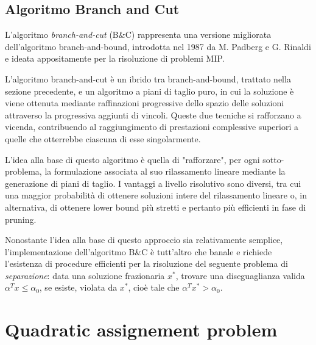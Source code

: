 \subsection{Algoritmo Branch and Cut}
L'algoritmo \textit{branch-and-cut} (B\&C) rappresenta una versione migliorata dell'algoritmo branch-and-bound, introdotta nel 1987
da M. Padberg e G. Rinaldi \cite{PADBERG19871} e ideata appositamente per la risoluzione di problemi MIP. 

L'algoritmo branch-and-cut è un ibrido tra branch-and-bound, trattato nella sezione precedente, e un algoritmo
a piani di taglio puro, in cui la soluzione è viene ottenuta mediante raffinazioni progressive dello spazio delle soluzioni attraverso la
progressiva aggiunti di vincoli.
Queste due tecniche si rafforzano a vicenda, contribuendo al raggiungimento di prestazioni complessive superiori a quelle
che otterrebbe ciascuna di esse singolarmente.

L'idea alla base di questo algoritmo è quella di "rafforzare", per ogni sotto-problema, la formulazione associata al suo rilassamento
lineare mediante la generazione di piani di taglio. I vantaggi a livello risolutivo sono diversi, tra cui una maggior probabilità di
ottenere soluzioni intere del rilassamento lineare o, in alternativa, di ottenere lower bound più stretti e pertanto più efficienti in 
fase di pruning. 

Nonostante l'idea alla base di questo approccio sia relativamente semplice, l'implementazione dell'algoritmo B\&C è tutt'altro che
banale e richiede l'esistenza di procedure efficienti per la risoluzione del seguente problema di \textsl{separazione}: data una
soluzione frazionaria {$x^*$}, trovare una diseguaglianza valida $\alpha^Tx\leq \alpha_0$, se esiste, violata da $x^*$, cioè
tale che $\alpha^Tx^*>\alpha_0$.

\section{Quadratic assignement problem}